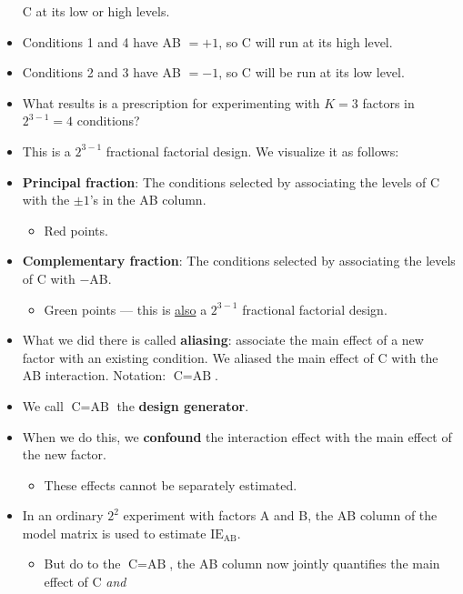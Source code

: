 \begin{itemize}
            C at its low or high levels.
      \item Conditions 1 and 4 have AB $ =+1 $, so C will run at its high level.
      \item Conditions 2 and 3 have AB $ =-1 $, so C will be run at its low level.
      \item What results is a prescription for experimenting with $K = 3$ factors in $ 2^{3-1}=4 $ conditions?
      \item This is a $ 2^{3-1} $ fractional factorial design. We visualize it as follows:
      \item \textbf{Principal fraction}: The conditions selected by associating the levels of C with the $±1$'s in the AB
            column.
            \begin{itemize}[label={}]
                  \item Red points.
            \end{itemize}
      \item \textbf{Complementary fraction}: The conditions selected by associating the levels of C with $ - $AB\@.
            \begin{itemize}[label={}]
                  \item Green points --- this is \underline{also} a $ 2^{3-1} $ fractional factorial design.
            \end{itemize}
      \item What we did there is called \textbf{aliasing}: associate the main effect of a new
            factor with an existing condition. We aliased the main effect of C with the AB interaction.
            Notation: $ \text{C}=\text{AB} $.
      \item We call $ \text{C}=\text{AB} $ the \textbf{design generator}.
      \item When we do this, we \textbf{confound} the interaction effect with the main effect of the new factor.
            \begin{itemize}[$\hookrightarrow$]
                  \item These effects cannot be separately estimated.
            \end{itemize}
      \item In an ordinary $2^2$ experiment with factors A and B, the AB column of the model matrix is used to
            estimate $ \text{IE}_{\text{AB}} $.
            \begin{itemize}
                  \item But do to the $ \text{C}=\text{AB} $, the AB column now jointly quantifies the main effect of C \emph{and}

\end{itemize}
\end{itemize}
